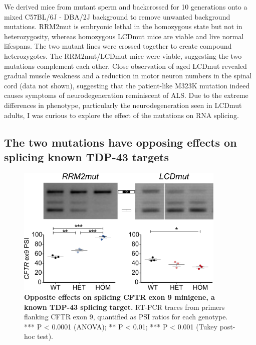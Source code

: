 We derived mice from mutant sperm and backcrossed for 10 generations onto a mixed C57BL/6J - DBA/2J background to remove unwanted background mutations.
RRM2mut is embryonic lethal in the homozygous state but not in heterozygosity, whereas homozygous LCDmut mice are viable and live normal lifespans. 
The two mutant lines were crossed together to create compound heterozygotes.
The RRM2mut/LCDmut mice were viable, suggesting the two mutations complement each other.
Close observation of aged LCDmut revealed gradual muscle weakness and a reduction in motor neuron numbers in the spinal cord (data not shown), suggesting that the patient-like M323K mutation indeed causes symptoms of neurodegeneration reminiscent of ALS. 
Due to the extreme differences in phenotype, particularly the neurodegeneration seen in LCDmut adults, I was curious to explore the effect of the mutations on RNA splicing.

\subsection{The two mutations have opposing effects on splicing known TDP-43 targets}

\begin{figure}[h!]
	\centering
	\includegraphics[width=10cm]{Figures/05_tdp_mice/CFTR.png}
	\caption[Opposite effects on splicing CFTR exon 9 minigene]{
		\textbf{Opposite effects on splicing CFTR exon 9 minigene, a known TDP-43 splicing target.}
	RT-PCR traces from primers flanking CFTR exon 9, quantified as PSI ratios for each genotype. *** P < 0.0001 (ANOVA); ** P < 0.01; *** P < 0.001 (Tukey post-hoc test).
	}	
	\label{fig:CFTR}
\end{figure}

